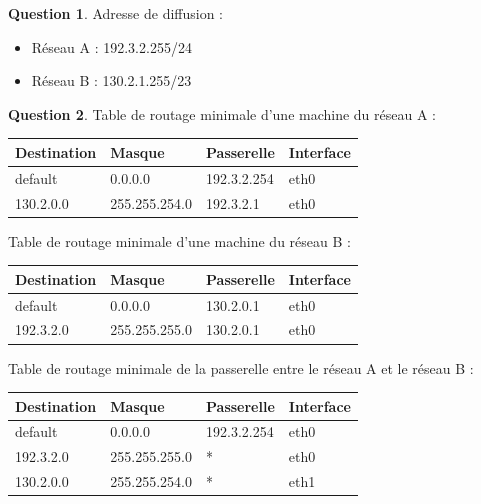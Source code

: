 \documentclass[11pt,english,french]{scrreprt}
\theoremstyle{remark}
\theoremstyle{definition}
\newtheorem{ques}{Question}[section]
\begin{document}
\begin{ques}
	Adresse de diffusion :\begin{itemize}
		\item Réseau A : 192.3.2.255/24
		\item Réseau B : 130.2.1.255/23
	\end{itemize}
\end{ques}

\begin{ques}
	Table de routage minimale d'une machine du réseau A : 
	
	\begin{tabularx}{\textwidth}{XXXX}
		\toprule 
		Destination & Masque & Passerelle & Interface\tabularnewline
		\midrule
		\midrule
		default & 0.0.0.0 & 192.3.2.254 & eth0\tabularnewline
		\midrule
		130.2.0.0 & 255.255.254.0 & 192.3.2.1 & eth0\tabularnewline
		\bottomrule
	\end{tabularx}
	
	Table de routage minimale d'une machine du réseau B :
	
	\begin{tabularx}{\textwidth}{XXXX}
		\toprule 
		Destination & Masque & Passerelle & Interface\tabularnewline
		\midrule
		\midrule
		default & 0.0.0.0 & 130.2.0.1 & eth0\tabularnewline
		\midrule
		192.3.2.0 & 255.255.255.0 & 130.2.0.1 & eth0\tabularnewline
		\bottomrule
	\end{tabularx}
	
	Table de routage minimale de la passerelle entre le réseau A et le réseau B :
	
	\begin{tabularx}{\textwidth}{XXXX}
		\toprule 
		Destination & Masque & Passerelle & Interface\tabularnewline
		\midrule
		\midrule
		default & 0.0.0.0 & 192.3.2.254 & eth0\tabularnewline
		\midrule
		192.3.2.0 & 255.255.255.0 & {*} & eth0\tabularnewline
		\midrule
		130.2.0.0 & 255.255.254.0 & {*} & eth1\tabularnewline
		\bottomrule
	\end{tabularx}
\end{ques}
\end{document}
